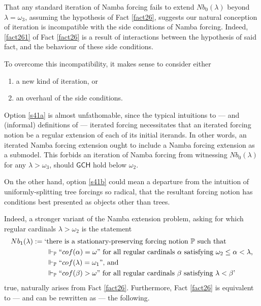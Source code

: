 \documentclass[12pt]{article}
\numberwithin{equation}{section}
\begin{document}
\begin{rem}\label{rem47}
That any standard iteration of Namba forcing fails to extend $Nb_0(\lambda)$ beyond $\lambda = \omega_3$, assuming the hypothesis of Fact \ref{fact26}, suggests our natural conception of iteration is incompatible with the side conditions of Namba forcing. Indeed, \ref{fact261} of Fact \ref{fact26} is a result of interactions between the hypothesis of said fact, and the behaviour of these side conditions. 

To overcome this incompatibility, it makes sense to consider either
\begin{enumerate}[label=(\alph*)]
    \item\label{s41a} a new kind of iteration, or 
    \item\label{s41b} an overhaul of the side conditions.
\end{enumerate} 

Option \ref{s41a} is almost unfathomable, since the typical intuitions to --- and (informal) definitions of --- iterated forcing necessitates that an iterated forcing notion be a regular extension of each of its initial iterands. In other words, an iterated Namba forcing extension ought to include a Namba forcing extension as a submodel. This forbids an iteration of Namba forcing from witnessing $Nb_0(\lambda)$ for any $\lambda > \omega_3$, should $\mathsf{GCH}$ hold below $\omega_2$. 

On the other hand, option \ref{s41b} could mean a departure from the intuition of uniformly-splitting tree forcings so radical, that the resultant forcing notion has conditions best presented as objects other than trees.
\end{rem}

Indeed, a stronger variant of the Namba extension problem, asking for which regular cardinals $\lambda > \omega_2$ is the statement
\begin{align*}
    Nb_1(\lambda) := \text{`} & \text{there is a stationary-preserving forcing notion } \mathbb{P} \text{ such that} \\ 
    & \Vdash_{\mathbb{P}} ``cof(\alpha) = \omega" \text{ for all regular cardinals } \alpha \text{ satisfying } \omega_2 \leq \alpha < \lambda \text{,} \\
    & \Vdash_{\mathbb{P}} ``cof(\lambda) = \omega_1" \text{, and} \\
    & \Vdash_{\mathbb{P}} ``cof(\beta) > \omega" \text{ for all regular cardinals } \beta \text{ satisfying } \lambda < \beta \text{'}
\end{align*}
true, naturally arises from Fact \ref{fact26}. Furthermore, Fact \ref{fact26} is equivalent to --- and can be rewritten as --- the following.
\end{document}
